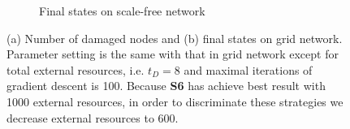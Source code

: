 \begin{figure}
\begin{subfigure}[t]{0.8\textwidth}
		\caption{Final states on scale-free network}
	\end{subfigure}
	\caption{(a) Number of damaged nodes and (b) final states on grid network. Parameter setting is the same with that in grid network except for total external resources, i.e. $t_D=8$ and maximal iterations of gradient descent is 100. Because \textbf{S6} has achieve best result with 1000 external resources, in order to discriminate these strategies we decrease external resources to 600.}
	\label{fig:opt_on_sf}
\end{figure}



